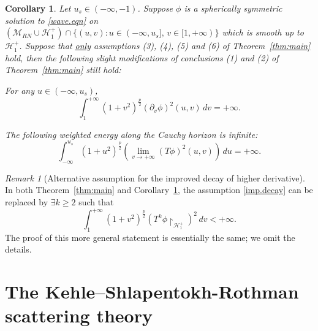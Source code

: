 \documentclass[10pt, reqno]{amsart}
\newtheorem{corollary}[theorem]{Corollary}
\theoremstyle{definition}
\theoremstyle{remark}
\newtheorem{remark}[theorem]{Remark}
\numberwithin{equation}{section}
\newcommand{\rd}{\partial}
\newcommand{\0}{\emptyset}
\newcommand{\calH}{\mathcal H}
\newcommand{\f}{\frac}
\newcommand{\EH}{\calH^{+}}
\begin{document}




\begin{corollary}\label{cor:main}
Let $u_s \in (-\infty, -1)$. Suppose $\phi$ is a spherically symmetric solution to \eqref{wave.eqn} on $(\mathcal M_{RN} \cup \mathcal H^+_1) \cap \{(u,v): u\in (-\infty,u_s],\, v\in [1,+\infty)\}$ which is smooth up to $\EH_1$. Suppose that \underline{only} assumptions (3), (4), (5) and (6) of Theorem~\ref{thm:main} hold, then the following slight modifications of conclusions (1) and (2) of Theorem~\ref{thm:main} still hold:
\begin{primenumerate}
\item For any $u\in (-\infty, u_s)$,
\begin{equation}\label{eq:main.instab.conclu.prime}
\int_{1}^{+\infty} (1+v^2)^{\f p 2}(\rd_v\phi)^2(u,v)\, dv =+\infty.
\end{equation}
\item The following weighted energy along the Cauchy horizon is infinite: 
\begin{equation}\label{eq:main.CH.conclu.prime}
\int_{-\infty}^{u_s} (1+ u^2)^{\f p 2}(\lim_{v\to+\infty}(T\phi)^2(u,v))\, du =+\infty.
\end{equation}
\end{primenumerate}
\end{corollary}

\begin{remark}[Alternative assumption for the improved decay of higher derivative]
In both Theorem~\ref{thm:main} and Corollary~\ref{cor:main}, the assumption \eqref{imp.decay} can be replaced by $\exists k\geq 2$ such that 
$$\int_{1}^{+\infty} (1+v^2)^{\f p2} (T^k\phi \restriction_{\EH_1})^2\, dv <+\infty.$$ 
The proof of this more general statement is essentially the same; we omit the details.
\end{remark}

\section{The Kehle--Shlapentokh-Rothman scattering theory}\label{sec:phase.space}
\end{document}
